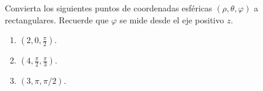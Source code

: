 Convierta los siguientes puntos de coordenadas esféricas $(\rho,\theta,\varphi)$ a rectangulares. Recuerde que $\varphi$ se mide desde el eje positivo $z$.
\begin{enumerate}
    \item $\left(2,0,\frac{\pi}{2}\right)$.
    \item $\left(4,\frac{\pi}{2},\frac{\pi}{3}\right)$.
    \item $(3,\pi,\pi/2)$.
\end{enumerate}
